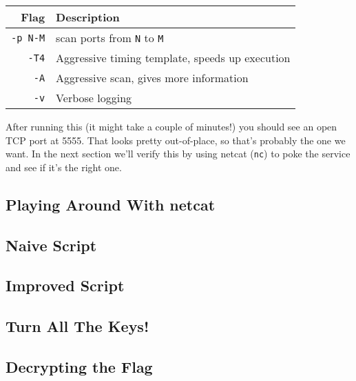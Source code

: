\documentclass[11pt]{article}
\begin{document}
    \begin{table*}[h!]
        \centering
        \label{tab:nmap-command}
        \begin{tabular}{|r|l|}
            \hline
            \textbf{Flag} & \textbf{Description}                            \\ \hline
            \verb`-p N-M` & scan ports from \verb`N` to \verb`M`            \\ \hline
            \verb`-T4`    & Aggressive timing template, speeds up execution \\ \hline
            \verb`-A`     & Aggressive scan, gives more information         \\ \hline
            \verb`-v`     & Verbose logging                                 \\ \hline
        \end{tabular}
    \end{table*}

    After running this (it might take a couple of minutes!) you should see an open TCP port at 5555. That looks pretty out-of-place, so that's probably the one we want. In the next section we'll verify this by using netcat (\verb`nc`) to poke the service and see if it's the right one.

    \subsection{Playing Around With netcat}\label{subsec:playing-around-with-nc}

    \subsection{Naive Script}\label{subsec:naive-script}

    \subsection{Improved Script}\label{subsec:improved-script}

    \subsection{Turn All The Keys!}\label{subsec:turn-all-the-keys}

    \subsection{Decrypting the Flag}\label{subsec:decrypting-the-flag}
\end{document}
